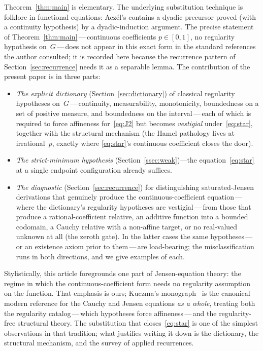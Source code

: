 \documentclass{article}
\theoremstyle{plain}
\theoremstyle{definition}
\begin{document}
Theorem~\ref{thm:main} is elementary. The underlying substitution
technique is folklore in functional equations: Acz\'el's
\cite[\S2.1.4]{Aczel1966} contains a dyadic precursor proved (with a
continuity hypothesis) by a dyadic-induction argument. The precise
statement of Theorem~\ref{thm:main}\,---\,continuous coefficients
$p\in[0,1]$, no regularity hypothesis on~$G$\,---\,does not appear in
this exact form in the standard references the author consulted; it is
recorded here because the recurrence pattern of
Section~\ref{sec:recurrence} needs it as a separable lemma. The
contribution of the present paper is in three parts:
\begin{itemize}
\item \emph{The explicit dictionary} (Section~\ref{sec:dictionary}) of
  classical regularity hypotheses on~$G$\,---\,continuity, measurability,
  monotonicity, boundedness on a set of positive measure, and
  boundedness on the interval\,---\,each of which is required to force
  affineness for~\eqref{eq:J2} but becomes \emph{vestigial}
  under~\eqref{eq:star}, together with the structural mechanism (the
  Hamel pathology lives at irrational~$p$, exactly where
  \eqref{eq:star}'s continuous coefficient closes the door).

\item \emph{The strict-minimum hypothesis}
  (Section~\ref{ssec:weak})---the
  equation~\eqref{eq:star} at a single endpoint configuration already
  suffices.

\item \emph{The diagnostic} (Section~\ref{sec:recurrence}) for
  distinguishing saturated-Jensen derivations that genuinely produce
  the continuous-coefficient equation\,---\,where the dictionary's
  regularity hypotheses are vestigial\,---\,from those that produce a
  rational-coefficient relative, an additive function into a bounded
  codomain, a Cauchy relative with a non-affine target, or no
  real-valued unknown at all (the zeroth gate). In the
  latter cases the same hypotheses\,---\,or an existence axiom prior
  to them\,---\,are load-bearing; the
  misclassification runs in both directions, and we give examples of
  each.
\end{itemize}

Stylistically, this article foregrounds one part of Jensen-equation
theory: the regime in which the continuous-coefficient form needs no
regularity assumption on the function. That emphasis is ours; Kuczma's
monograph~\cite{Kuczma2009} is the canonical modern reference for the
Cauchy and Jensen equations \emph{as a whole}, treating both the
regularity catalog\,---\,which hypotheses force affineness\,---\,and the
regularity-free structural theory.
The substitution that closes~\eqref{eq:star} is one of the simplest
observations in that tradition; what justifies writing it down is the
dictionary, the structural mechanism, and the survey of applied
recurrences.
\end{document}
